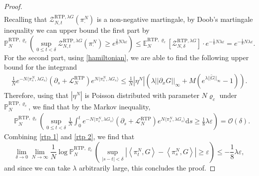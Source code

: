 \documentclass[11pt]{article}
\numberwithin{equation}{section}
\theoremstyle{definition}
\theoremstyle{plain}
\newcommand{\E}{\mathbb{E}}
\newcommand{\p}{\mathbb{P}}
\newcommand{\dd}{\mathrm{d}}
\newcommand{\RTP}{\mathrm{RTP}}
\begin{document}
\begin{proof}
\begin{align}
    \end{align}
Recalling that $\mathcal{Z}^{\RTP,\lambda G}_{N,t}(\pi^N_{\cdot})$ is a non-negative martingale, by  Doob's martingale inequality we can upper bound the first part by 
    \begin{equation}\label{rtp 1}
        \p^{\RTP,\varrho_c}_N\left(\sup_{0\leq t<\delta } \mathcal{Z}^{\RTP,\lambda G}_{N,t}(\pi^N_{\cdot}) \geq e^{\frac{1}{8}N\lambda \varepsilon}\right) \leq  \E^{\RTP,\varrho_c}_N\left[ \mathcal{Z}^{\RTP,\lambda G}_{N,\delta}\right]\cdot e^{-\frac{1}{8}N\lambda \varepsilon}  = e^{-\frac{1}{8}N\lambda \varepsilon}. 
    \end{equation}
For the second part, using \eqref{hamiltonian}, we are able to find the following upper bound for the integrand
    \begin{align}
        \frac{1}{N} e^{-N\langle \pi^N_{s},\lambda G_s\rangle}(\partial_s + \mathscr{L}^{\RTP}_N) e^{N\langle \pi^N_{s},\lambda G_s\rangle}
        \leq \frac{1}{N}|\eta^N|\left( \lambda ||\partial_x G||_\infty  + M\left(e^{\lambda ||\widetilde{G}||_\infty}-1\right)\right).
    \end{align}
Therefore, using that $|\eta^N|$ is Poisson distributed with parameter $N\varrho_c$ under $\p^{\RTP,\varrho_c}_N$, we find that by the Markov inequality,
    \begin{align}\label{rtp 2}
        &\p^{\RTP,\varrho_c}_N\left( \sup_{0\leq t < \delta}\frac{1}{N}\int_{0}^{ t} e^{-N\langle \pi^N_{s},\lambda G_s\rangle}(\partial_s + \mathscr{L}^{\RTP}_N) e^{N\langle \pi^N_{s},\lambda G_s\rangle} \dd s \geq \tfrac{1}{8}\lambda \varepsilon \right) = \mathcal{O}(\delta).
    \end{align}
Combining \eqref{rtp 1} and \eqref{rtp 2}, we find that 
    \begin{equation}
        \lim_{\delta\to0} \lim_{N\to\infty} \frac{1}{N}\log \p^{\RTP,\varrho_c}_N\left(\sup_{|s-t|<\delta} \left| \left<\pi^N_{t}, G\right> - \left<\pi^N_{s}, G\right> \right| \geq \varepsilon \right)\leq -\frac{1}{8}\lambda \varepsilon,
    \end{equation}
and since we can take $\lambda$ arbitrarily large, this concludes the proof.
\end{proof}
\end{document}
